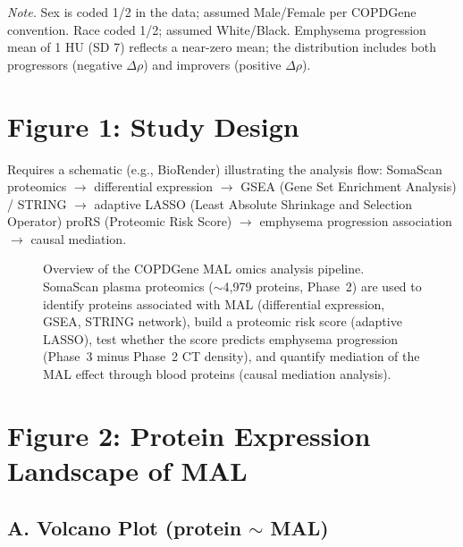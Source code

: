 \documentclass[11pt, letterpaper]{article}
\begin{document}
\noindent\textit{Note.} Sex is coded 1/2 in the data; assumed Male/Female
per COPDGene convention. Race coded 1/2; assumed White/Black. Emphysema
progression mean of 1 HU (SD 7) reflects a near-zero mean; the
distribution includes both progressors (negative $\Delta\rho$) and
improvers (positive $\Delta\rho$).

\section*{Figure 1: Study Design}

\noindent Requires a schematic (e.g., BioRender) illustrating the analysis flow:
SomaScan proteomics $\to$ differential expression $\to$ GSEA (Gene Set
Enrichment Analysis) / STRING $\to$ adaptive LASSO (Least Absolute
Shrinkage and Selection Operator) proRS (Proteomic Risk Score) $\to$
emphysema progression association $\to$ causal mediation.

\begin{figure}[H]
  \centering
  \caption{Overview of the COPDGene MAL omics analysis pipeline.
    SomaScan plasma proteomics ($\sim$4,979 proteins, Phase~2) are used
    to identify proteins associated with MAL (differential expression,
    GSEA, STRING network), build a proteomic risk score (adaptive LASSO),
    test whether the score predicts emphysema progression (Phase~3
    minus Phase~2 CT density), and quantify mediation of the MAL effect
    through blood proteins (causal mediation analysis).}
\end{figure}

\section*{Figure 2: Protein Expression Landscape of MAL}

\subsection*{A. Volcano Plot (protein $\sim$ MAL)}
\end{document}
